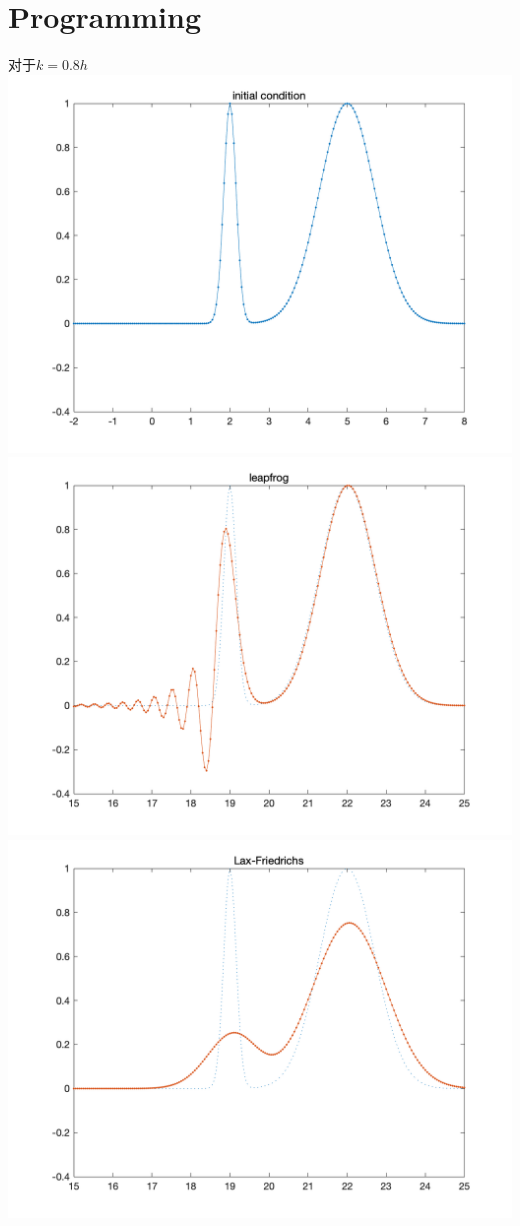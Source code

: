 \documentclass{article}
\begin{document}
\section{Programming}
对于$k=0.8h$\\
\includegraphics[scale = 0.175]{initial.png}
\includegraphics[scale = 0.175]{leapfrog.png}\\
\includegraphics[scale = 0.175]{Lax_Friedrichs.png}
\end{document}
